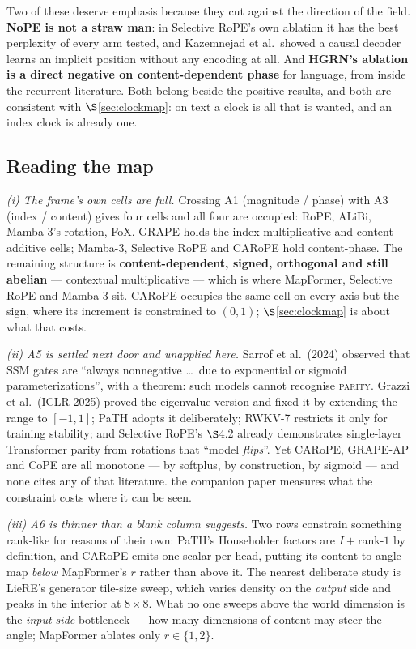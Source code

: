 \documentclass[11pt]{article}
\begin{document}
\noindent Two of these deserve emphasis because they cut against the direction of the
field. \textbf{NoPE is not a straw man}: in Selective RoPE's own ablation it has the
best perplexity of every arm tested, and Kazemnejad et al.\ showed a causal decoder
learns an implicit position without any encoding at all. And \textbf{HGRN's ablation
is a direct negative on content-dependent phase} for language, from inside the
recurrent literature. Both belong beside the positive results, and both are consistent
with $\S$\ref{sec:clockmap}: on text a clock is all that is wanted, and an index clock
is already one.

\subsection{Reading the map}

\emph{(i) The frame's own cells are full.} Crossing A1 (magnitude / phase) with A3
(index / content) gives four cells and all four are occupied: RoPE, ALiBi, Mamba-3's
rotation, FoX. GRAPE holds the index-multiplicative and content-additive cells;
Mamba-3, Selective RoPE and CARoPE hold content-phase. The remaining structure is
\textbf{content-dependent, signed, orthogonal and still abelian} --- contextual
multiplicative --- which is where MapFormer, Selective RoPE and Mamba-3 sit.
CARoPE occupies the same cell on every axis but the sign, where its increment is
constrained to $(0,1)$; $\S$\ref{sec:clockmap} is about what that costs.

\emph{(ii) A5 is settled next door and unapplied here.} Sarrof et al.\ (2024)
observed that SSM gates are ``always nonnegative \dots\ due to exponential or sigmoid
parameterizations'', with a theorem: such models cannot recognise \textsc{parity}.
Grazzi et al.\ (ICLR 2025) proved the eigenvalue version and fixed it by extending
the range to $[-1,1]$; PaTH adopts it deliberately; RWKV-7 restricts it only for
training stability; and Selective RoPE's $\S$4.2 already demonstrates single-layer
Transformer parity from rotations that ``model \emph{flips}''. Yet CARoPE, GRAPE-AP
and CoPE are all monotone --- by softplus, by construction, by sigmoid --- and none
cites any of that literature. the companion paper measures what the constraint costs
where it can be seen.

\emph{(iii) A6 is thinner than a blank column suggests.} Two rows constrain something
rank-like for reasons of their own: PaTH's Householder factors are $I + $rank-$1$ by
definition, and CARoPE emits one scalar per head, putting its content-to-angle map
\emph{below} MapFormer's $r$ rather than above it. The nearest deliberate study is
LieRE's generator tile-size sweep, which varies density on the \emph{output} side and
peaks in the interior at $8\times8$. What no one sweeps above the world dimension
is the \emph{input-side} bottleneck --- how many dimensions of content may steer the
angle; MapFormer ablates only $r\in\{1,2\}$.
\end{document}
